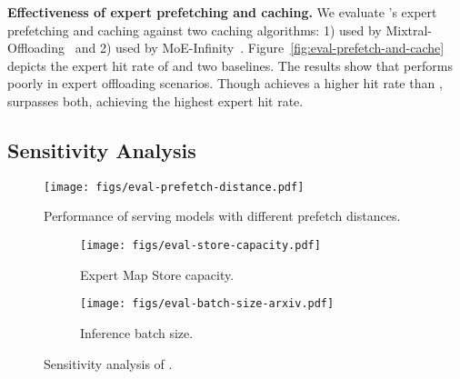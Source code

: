 \textbf{Effectiveness of expert prefetching and caching.}
We evaluate \sys's expert prefetching and caching against two caching algorithms:
1) \textbf{\LRU} used by Mixtral-Offloading~\cite{eliseev2023fast}
and 
2) \textbf{\LFU} used by MoE-Infinity~\cite{xue2024moe}.
%
Figure~\ref{fig:eval-prefetch-and-cache} depicts the expert hit rate of \sys and two baselines.
The results show that \LRU performs poorly in expert offloading scenarios. Though \LFU achieves a higher hit rate than \LRU, \sys surpasses both, achieving the highest expert hit rate.

\subsection{Sensitivity Analysis}
\label{subsec:eval-sensitivity}


\begin{figure}[t]
  \centering
  \texttt{[image: figs/eval-prefetch-distance.pdf]}
  \vspace{-0.15in}
  \caption{Performance of \sys serving \MoE models with different prefetch distances.}
  \vspace{-0.1in}
  \label{fig:eval-prefetch-distance}
\end{figure}


\begin{figure}[t]
    \centering
    \begin{subfigure}[t]{0.55\linewidth}
        \centering
        \texttt{[image: figs/eval-store-capacity.pdf]}
        \caption{Expert Map Store capacity.}
        \label{fig:eval-store-capacity}
    \end{subfigure}
    \begin{subfigure}[t]{0.435\linewidth}
        \centering
        \texttt{[image: figs/eval-batch-size-arxiv.pdf]}
        \caption{Inference batch size.}
        \label{fig:eval-batch-size}
    \end{subfigure}
    \vspace{-0.1in}
    \caption{Sensitivity analysis of \sys.}
    \vspace{-0.2in}
    \label{fig:eval-sensitivity}
\end{figure}


